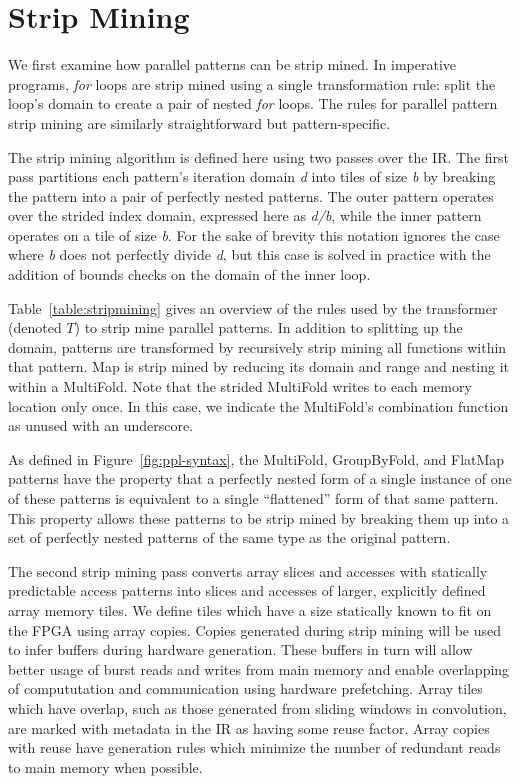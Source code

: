 

\section{Strip Mining}
\label{sec:strip-mining}
We first examine how parallel patterns can be strip mined.
In imperative programs, \emph{for} loops are strip mined using a single transformation
rule: split the loop's domain to create a pair of nested \emph{for} loops.
The rules for parallel pattern strip mining are similarly straightforward
but pattern-specific.

The strip mining algorithm is defined here using two passes over the IR.
The first pass partitions each pattern's iteration domain \emph{d} into tiles of
size \emph{b} by breaking the pattern into a pair of perfectly nested patterns.
The outer pattern operates over the strided index domain, expressed here as
\emph{d/b}, while the inner pattern operates on a tile of size \emph{b}.
For the sake of brevity this notation ignores the case where \emph{b} does not
perfectly divide \emph{d}, but this case is solved in practice with the
addition of bounds checks on the domain of the inner loop.

Table~\ref{table:stripmining} gives an overview of the rules used by the transformer
(denoted $T$) to strip mine parallel patterns.
In addition to splitting up the domain, patterns are transformed by recursively
strip mining all functions within that pattern.
Map is strip mined by reducing its domain and range and nesting it within a MultiFold.
Note that the strided MultiFold writes to each memory location only once.
In this case, we indicate the MultiFold's combination function as unused with an underscore.

As defined in Figure~\ref{fig:ppl-syntax}, the MultiFold, GroupByFold, and FlatMap patterns have the property that a perfectly nested form of a single instance of one of these
patterns is equivalent to a single ``flattened'' form of that same pattern. This property allows these patterns to be strip mined by
breaking them up into a set of perfectly nested patterns of the same type as the original pattern.

The second strip mining pass converts array slices and accesses with statically predictable access patterns into slices and accesses of larger, explicitly defined
array memory tiles. We define tiles which have a size statically known to fit on the FPGA using array copies.
Copies generated during strip mining will be used to infer buffers during hardware generation.
These buffers in turn will allow better usage of burst reads and writes from main memory and enable overlapping of compututation and communication using hardware prefetching.
Array tiles which have overlap, such as those generated from sliding windows in convolution, are marked with metadata in the IR as having some reuse factor.
Array copies with reuse have generation rules which minimize the number of redundant reads to main memory when possible.

